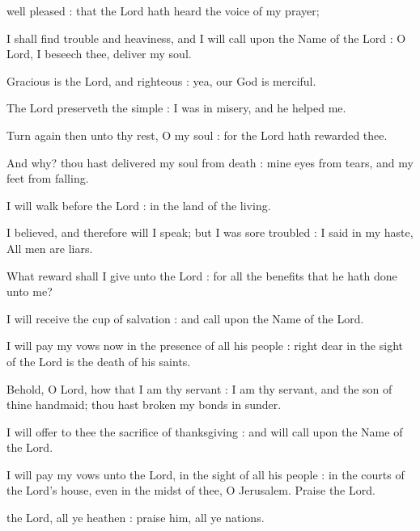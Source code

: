  well pleased : that the Lord hath heard the voice of my prayer;\par
{}
I shall find trouble and heaviness, and I will call upon the Name of the Lord : O Lord, I beseech thee, deliver my soul.\par
{}Gracious is the Lord, and righteous : yea, our God is merciful.\par
{}The Lord preserveth the simple : I was in misery, and he helped me.\par
{}Turn again then unto thy rest, O my soul : for the Lord hath rewarded thee.\par
{}And why? thou hast delivered my soul from death : mine eyes from tears, and my feet from falling.\par
{}I will walk before the Lord : in the land of the living.\par
{}I believed, and therefore will I speak; but I was sore troubled : I said in my haste, All men are liars.\par
{}What reward shall I give unto the Lord : for all the benefits that he hath done unto me?\par
{}I will receive the cup of salvation : and call upon the Name of the Lord.\par
{}I will pay my vows now in the presence of all his people : right dear in the sight of the Lord is the death of his saints.\par
{}Behold, O Lord, how that I am thy servant : I am thy servant, and the son of thine handmaid; thou hast broken my bonds in sunder.\par
{}I will offer to thee the sacrifice of thanksgiving : and will call upon the Name of the Lord.\par
{}I will pay my vows unto the Lord, in the sight of all his people : in the courts of the Lord's house, even in the midst of thee, O Jerusalem. Praise the Lord.\par


 the Lord, all ye heathen : praise him, all ye nations.\par
{}

